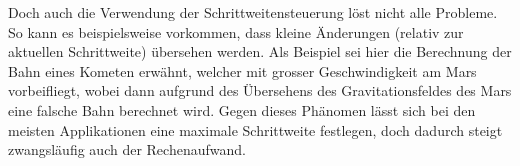 Doch auch die Verwendung der Schrittweitensteuerung löst nicht alle Probleme.
So kann es beispielsweise vorkommen, dass kleine Änderungen (relativ zur aktuellen Schrittweite) übersehen werden.
Als Beispiel sei hier die Berechnung der Bahn eines Kometen erwähnt, welcher mit grosser Geschwindigkeit am Mars vorbeifliegt,
%
%
wobei dann aufgrund des Übersehens des Gravitationsfeldes des Mars eine falsche Bahn berechnet wird.
%
Gegen dieses Phänomen lässt sich bei den meisten Applikationen eine maximale Schrittweite festlegen,
doch dadurch steigt zwangsläufig auch der Rechenaufwand.

\FloatBarrier
